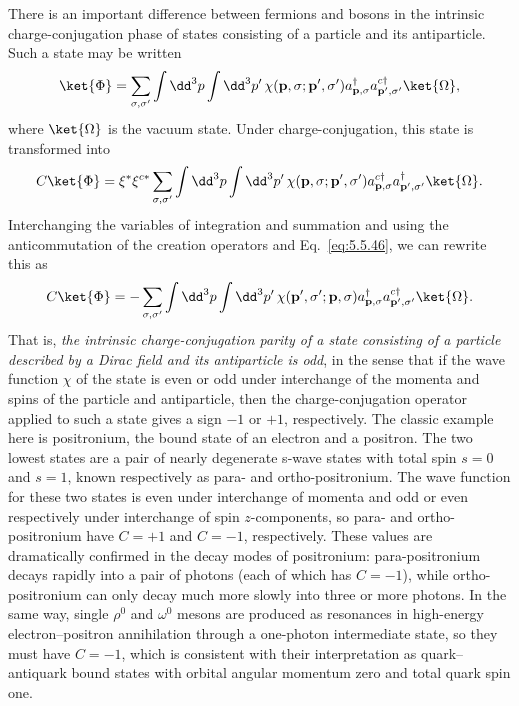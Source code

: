 There is an important difference between fermions and bosons in the intrinsic
charge-conjugation phase of states consisting of a particle and its
antiparticle. Such a state may be written
\[
\ket{\Phi}=\sum_{\sigma,\sigma'}\int \dd^3p\int \dd^3p'\,
\chi(\mathbf p,\sigma;\mathbf p',\sigma')a^\dagger_{\mathbf p,\sigma}
a^{c\dagger}_{\mathbf p',\sigma'}\ket{\Omega},
\]
where $\ket{\Omega}$ is the vacuum state. Under charge-conjugation, this state
is transformed into
\[
C\ket{\Phi}=\xi^*\xi^{c*}\sum_{\sigma,\sigma'}\int \dd^3p\int \dd^3p'\,
\chi(\mathbf p,\sigma;\mathbf p',\sigma')a^{c\dagger}_{\mathbf p,\sigma}
a^\dagger_{\mathbf p',\sigma'}\ket{\Omega}.
\]
Interchanging the variables of integration and summation and using the
anticommutation of the creation operators and Eq.~\eqref{eq:5.5.46}, we can rewrite
this as
\[
C\ket{\Phi}=-\sum_{\sigma,\sigma'}\int \dd^3p\int \dd^3p'\,
\chi(\mathbf p',\sigma';\mathbf p,\sigma)a^\dagger_{\mathbf p,\sigma}
a^{c\dagger}_{\mathbf p',\sigma'}\ket{\Omega}.
\]
That is, \emph{the intrinsic charge-conjugation parity of a state consisting
of a particle described by a Dirac field and its antiparticle is odd}, in the
sense that if the wave function $\chi$ of the state is even or odd under
interchange of the momenta and spins of the particle and antiparticle, then the
charge-conjugation operator applied to such a state gives a sign $-1$ or $+1$,
respectively. The classic example here is positronium, the bound state of an
electron and a positron. The two lowest states are a pair of nearly degenerate
s-wave states with total spin $s=0$ and $s=1$, known respectively as para- and
ortho-positronium. The wave function for these two states is even under
interchange of momenta and odd or even respectively under interchange of spin
$z$-components, so para- and ortho-positronium have $C=+1$ and $C=-1$,
respectively. These values are dramatically confirmed in the decay modes of
positronium: para-positronium decays rapidly into a pair of photons (each of
which has $C=-1$), while ortho-positronium can only decay much more slowly into
three or more photons. In the same way, single $\rho^0$ and $\omega^0$ mesons
are produced as resonances in high-energy electron--positron annihilation
through a one-photon intermediate state, so they must have $C=-1$, which is
consistent with their interpretation as quark--antiquark bound states with
orbital angular momentum zero and total quark spin one.

